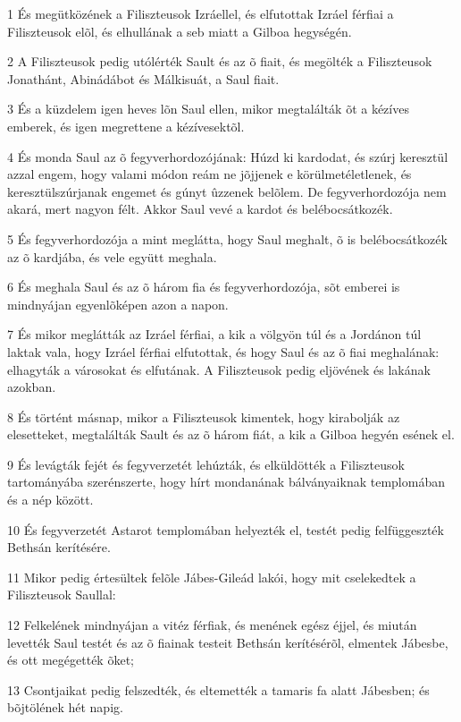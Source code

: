 \par 1 És megütközének a Filiszteusok Izráellel, és elfutottak Izráel férfiai a Filiszteusok elõl, és elhullának a seb miatt a  Gilboa hegységén.
\par 2 A Filiszteusok pedig utólérték Sault és az õ fiait, és megölték a Filiszteusok Jonathánt, Abinádábot és Málkisuát, a Saul fiait.
\par 3 És a küzdelem igen heves lõn Saul ellen, mikor megtalálták õt a kézíves emberek, és igen megrettene a kézívesektõl.
\par 4 És monda Saul az õ fegyverhordozójának: Húzd ki kardodat, és szúrj keresztül azzal engem, hogy valami módon reám ne jõjjenek e körülmetéletlenek, és keresztülszúrjanak engemet és gúnyt ûzzenek belõlem. De fegyverhordozója nem akará, mert nagyon félt. Akkor Saul vevé a kardot és belébocsátkozék.
\par 5 És fegyverhordozója a mint meglátta, hogy Saul meghalt, õ is belébocsátkozék az õ kardjába, és vele együtt meghala.
\par 6 És meghala Saul és az õ három fia és fegyverhordozója, sõt emberei is mindnyájan egyenlõképen azon a napon.
\par 7 És mikor meglátták az Izráel férfiai, a kik a völgyön túl és a Jordánon túl laktak vala, hogy Izráel férfiai elfutottak, és hogy Saul és az õ fiai meghalának: elhagyták a városokat és elfutának. A Filiszteusok pedig eljövének és lakának azokban.
\par 8 És történt másnap, mikor a Filiszteusok kimentek, hogy kirabolják az elesetteket, megtalálták Sault és az õ három fiát, a kik a Gilboa hegyén esének el.
\par 9 És levágták fejét és fegyverzetét lehúzták, és elküldötték a Filiszteusok tartományába szerénszerte, hogy hírt mondanának bálványaiknak templomában és a nép között.
\par 10 És fegyverzetét Astarot templomában helyezték el, testét pedig felfüggeszték Bethsán kerítésére.
\par 11 Mikor pedig értesültek felõle Jábes-Gileád lakói, hogy mit cselekedtek a Filiszteusok Saullal:
\par 12 Felkelének mindnyájan a vitéz férfiak, és menének egész éjjel, és miután levették Saul testét és az õ fiainak testeit Bethsán kerítésérõl, elmentek Jábesbe, és ott megégették õket;
\par 13 Csontjaikat pedig felszedték, és eltemették a tamaris fa alatt Jábesben; és bõjtölének hét napig.


